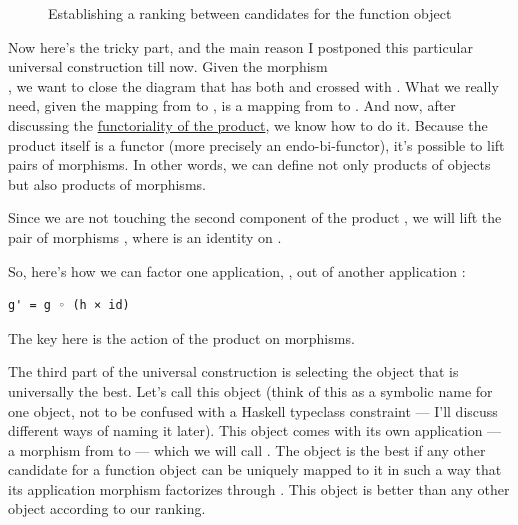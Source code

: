 \begin{figure}
\centering
{}
\caption{Establishing a ranking between candidates for the function object}
\end{figure}

Now here's the tricky part, and the main reason I postponed this
particular universal construction till now. Given the morphism\\
, we want to close the diagram
that has both  and  crossed with .
What we really need, given the mapping  from 
to , is a mapping from  to .
And now, after discussing the \hyperref[functoriality]{functoriality
of the product}, we know how to do it. Because the product itself is a
functor (more precisely an endo-bi-functor), it's possible to lift pairs
of morphisms. In other words, we can define not only products of objects
but also products of morphisms.

Since we are not touching the second component of the product
, we will lift the pair of morphisms
, where  is an identity on .

So, here's how we can factor one application, , out of another
application :

\begin{Verbatim}[commandchars=\\\{\}]
g' = g ◦ (h × id)
\end{Verbatim}
The key here is the action of the product on morphisms.

The third part of the universal construction is selecting the object
that is universally the best. Let's call this object  (think
of this as a symbolic name for one object, not to be confused with a
Haskell typeclass constraint --- I'll discuss different ways of naming
it later). This object comes with its own application --- a morphism
from  to  --- which we will call
. The object  is the best if any other
candidate for a function object can be uniquely mapped to it in such a
way that its application morphism  factorizes through
. This object is better than any other object according to
our ranking.

